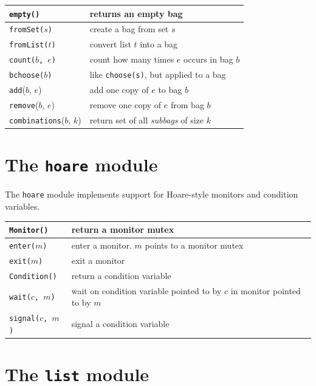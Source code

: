 \documentclass{report}
\begin{document}
\vspace{1em}
\begin{tabular}{|l|l|}
\hline
\texttt{empty()} & returns an empty bag\\
\hline
\texttt{fromSet($s$)} & create a bag from set $s$\\
\hline
\texttt{fromList($t$)} & convert list $t$ into a bag \\
\hline
\texttt{count($b$, $e$)} & count how many times $e$ occurs in bag $b$\\
\hline
\texttt{bchoose($b$)} & like \texttt{choose(s)}, but applied to a bag\\
\hline
\texttt{add}($b$, $e$) & add one copy of $e$ to bag $b$ \\
\hline
\texttt{remove}($b$, $e$) & remove one copy of $e$ from bag $b$ \\
\hline
\texttt{combinations}($b$, $k$) & return set of all \emph{subbags} of size $k$ \\
\hline
\end{tabular}

\section{The \texttt{hoare} module}
\label{ap:hoare}

%
The \texttt{hoare} module implements support for Hoare-style monitors
and condition variables.

\vspace{1em}
\begin{tabular}{|l|l|}
\hline
\texttt{Monitor()} & return a monitor mutex\\
\hline
\texttt{enter($m$)} & enter a monitor.  $m$ points to a monitor mutex\\
\hline
\texttt{exit($m$)} & exit a monitor\\
\hline
\texttt{Condition()} & return a condition variable\\
\hline
\texttt{wait($c$, $m$)} & wait on condition variable pointed to by $c$ in monitor pointed to by $m$\\
\hline
\texttt{signal($c$, $m$)} & signal a condition variable\\
\hline
\end{tabular}

\section{The \texttt{list} module}
\label{ap:list}
\end{document}
